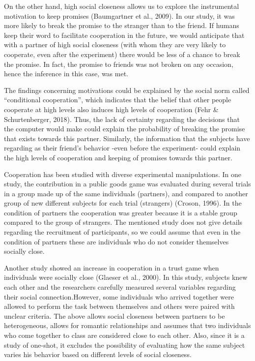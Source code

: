 \documentclass[12pt,]{article}
\begin{document}
On the other hand, high social closeness allows us to explore the
instrumental motivation to keep promises (Baumgartner et al., 2009). In
our study, it was more likely to break the promise to the stranger than
to the friend. If humans keep their word to facilitate cooperation in
the future, we would anticipate that with a partner of high social
closeness (with whom they are very likely to cooperate, even after the
experiment) there would be less of a chance to break the promise. In
fact, the promise to friends was not broken on any occasion, hence the
inference in this case, was met.

The findings concerning motivations could be explained by the social
norm called ``conditional cooperation'', which indicates that the belief
that other people cooperate at high levels also induces high levels of
cooperation (Fehr \& Schurtenberger, 2018). Thus, the lack of certainty
regarding the decisions that the computer would make could explain the
probability of breaking the promise that exists towards this partner.
Similarly, the information that the subjects have regarding as their
friend's behavior -even before the experiment- could explain the high
levels of cooperation and keeping of promises towards this partner.

Cooperation has been studied with diverse experimental manipulations. In
one study, the contribution in a public goods game was evaluated during
several trials in a group made up of the same individuals (partners),
and compared to another group of new different subjects for each trial
(strangers) (Croson, 1996). In the condition of partners the cooperation
was greater because it is a stable group compared to the group of
strangers. The mentioned study does not give details regarding the
recruitment of participants, so we could assume that even in the
condition of partners these are individuals who do not consider
themselves socially close.

Another study showed an increase in cooperation in a trust game when
individuals were socially close (Glaeser et al., 2000). In this study,
subjects knew each other and the researchers carefully measured several
variables regarding their social connection.However, some individuals
who arrived together were allowed to perform the task between themselves
and others were paired with unclear criteria. The above allows social
closeness between partners to be heterogeneous, allows for romantic
relationships and assumes that two individuals who come together to
class are considered close to each other. Also, since it is a study of
one-shot, it excludes the possibility of evaluating how the same subject
varies his behavior based on different levels of social closeness.
\end{document}
